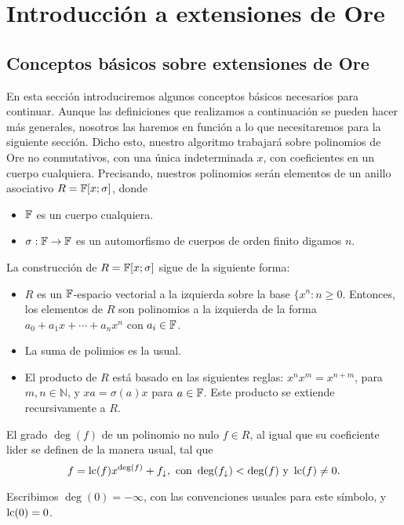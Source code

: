 \chapter{Introducción a extensiones de Ore}%
\label{chap:conceptos_básicos_sobre_extensiones_ore}
\section{Conceptos básicos sobre extensiones de Ore}
En esta sección introduciremos algunos conceptos básicos necesarios para continuar. Aunque las definiciones que realizamos a continuación se pueden hacer más generales, nosotros las haremos en función a lo que necesitaremos para la siguiente sección. Dicho esto, nuestro algoritmo trabajará sobre polinomios de Ore no conmutativos, con una única indeterminada \(x\), con coeficientes en un cuerpo cualquiera. Precisando, nuestros polinomios serán elementos de un anillo asociativo \(R = \mathbb{F}[x;\sigma]\), donde

\begin{itemize}
    \item \(\mathbb{F}\) es un cuerpo cualquiera.
    \item \(\sigma: \mathbb{F} \to \mathbb{F}\) es un automorfismo de cuerpos de orden finito digamos \(n\).
\end{itemize}

La construcción de \(R = \mathbb{F}[x;\sigma]\) sigue de la siguiente forma:
\begin{itemize}
    \item \(R\) es un \(\mathbb{F}\)-espacio vectorial a la izquierda sobre la base  \(\{x^n: n \geq 0\). Entonces, los elementos de  \(R\) son polinomios a la izquierda de la forma \(a_0 + a_1 x + \cdots + a_n x^n\) con \(a_i \in \mathbb{F}\).
    \item La suma de polimios es la usual.
    \item El producto de \(R\) está basado en las siguientes reglas: \(x^n x^m = x^{n+m}\), para \(m, n \in \mathbb{N}\), y \(xa = \sigma(a)x\) para  \(a \in \mathbb{F}\). Este producto se extiende recursivamente a \(R\).
\end{itemize}

El grado \(\deg (f)\) de un polinomio no nulo \(f \in R\), al igual que su coeficiente lider se definen de la manera usual, tal que
\[
f = \operatorname{lc}(f)x^{\deg(f)} + f_{\downarrow}, \text{ con } \deg(f_{\downarrow}) < \deg(f) \text{ y } \operatorname{lc}(f) \neq 0
.\]

Escribimos \(\deg(0) = -\infty\), con las convenciones usuales para este símbolo, y \(\operatorname{lc}(0) = 0\).

